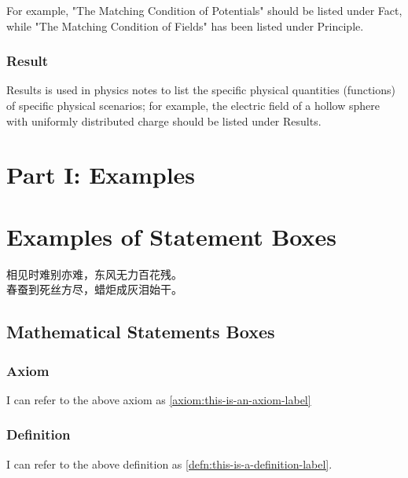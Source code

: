 \documentclass[oneside,10pt]{book}
\begin{document}
 For example, "The Matching Condition of Potentials" should be listed under Fact, while "The Matching Condition of Fields" has been listed under Principle.

 \subsection{Result}
Results is used in physics notes to list the specific physical quantities (functions) of specific physical scenarios; for example, the electric field of a hollow sphere with uniformly distributed charge should be listed under Results.


\chapter*{Part I: Examples}


\chapter{Examples of Statement Boxes}
\begin{flushright}
    相见时难别亦难，东风无力百花残。\\
    春蚕到死丝方尽，蜡炬成灰泪始干。
\end{flushright}

\section{Mathematical Statements Boxes}
\subsection{Axiom}
I can refer to the above axiom as \ref{axiom:this-is-an-axiom-label}

\subsection{Definition}
I can refer to the above definition as \ref{defn:this-is-a-definition-label}.
\end{document}
